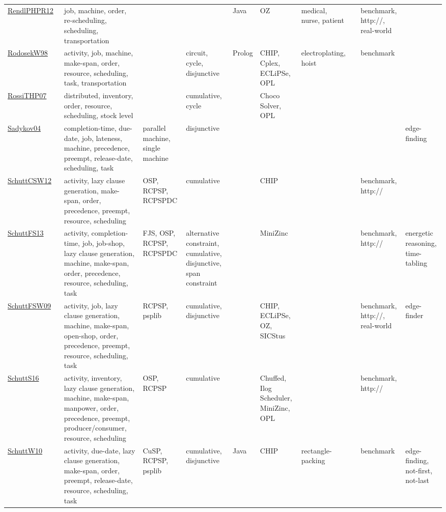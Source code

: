 {\begin{longtable}{p{3cm}p{4cm}p{2cm}p{2cm}p{2cm}p{2cm}p{2cm}p{2cm}p{2cm}p{2cm}}
\href{papers/RendlPHPR12.pdf}{RendlPHPR12}~\cite{RendlPHPR12} & job, machine, order, re-scheduling, scheduling, transportation &  &  & Java & OZ & medical, nurse, patient &  & benchmark, http://, real-world & \\
\href{papers/RodosekW98.pdf}{RodosekW98}~\cite{RodosekW98} & activity, job, machine, make-span, order, resource, scheduling, task, transportation &  & circuit, cycle, disjunctive & Prolog & CHIP, Cplex, ECLiPSe, OPL & electroplating, hoist &  & benchmark & \\
\href{papers/RossiTHP07.pdf}{RossiTHP07}~\cite{RossiTHP07} & distributed, inventory, order, resource, scheduling, stock level &  & cumulative, cycle &  & Choco Solver, OPL &  &  &  & \\
\href{papers/Sadykov04.pdf}{Sadykov04}~\cite{Sadykov04} & completion-time, due-date, job, lateness, machine, precedence, preempt, release-date, scheduling, task & parallel machine, single machine & disjunctive &  &  &  &  &  & edge-finding\\
\href{papers/SchuttCSW12.pdf}{SchuttCSW12}~\cite{SchuttCSW12} & activity, lazy clause generation, make-span, order, precedence, preempt, resource, scheduling & OSP, RCPSP, RCPSPDC & cumulative &  & CHIP &  &  & benchmark, http:// & \\
\href{papers/SchuttFS13.pdf}{SchuttFS13}~\cite{SchuttFS13} & activity, completion-time, job, job-shop, lazy clause generation, machine, make-span, order, precedence, resource, scheduling, task & FJS, OSP, RCPSP, RCPSPDC & alternative constraint, cumulative, disjunctive, span constraint &  & MiniZinc &  &  & benchmark, http:// & energetic reasoning, time-tabling\\
\href{papers/SchuttFSW09.pdf}{SchuttFSW09}~\cite{SchuttFSW09} & activity, job, lazy clause generation, machine, make-span, open-shop, order, precedence, preempt, resource, scheduling, task & RCPSP, psplib & cumulative, disjunctive &  & CHIP, ECLiPSe, OZ, SICStus &  &  & benchmark, http://, real-world & edge-finder\\
\href{papers/SchuttS16.pdf}{SchuttS16}~\cite{SchuttS16} & activity, inventory, lazy clause generation, machine, make-span, manpower, order, precedence, preempt, producer/consumer, resource, scheduling & OSP, RCPSP & cumulative &  & Chuffed, Ilog Scheduler, MiniZinc, OPL &  &  & benchmark, http:// & \\
\href{papers/SchuttW10.pdf}{SchuttW10}~\cite{SchuttW10} & activity, due-date, lazy clause generation, make-span, order, preempt, release-date, resource, scheduling, task & CuSP, RCPSP, psplib & cumulative, disjunctive & Java & CHIP & rectangle-packing &  & benchmark & edge-finding, not-first, not-last\\

\end{longtable}}
